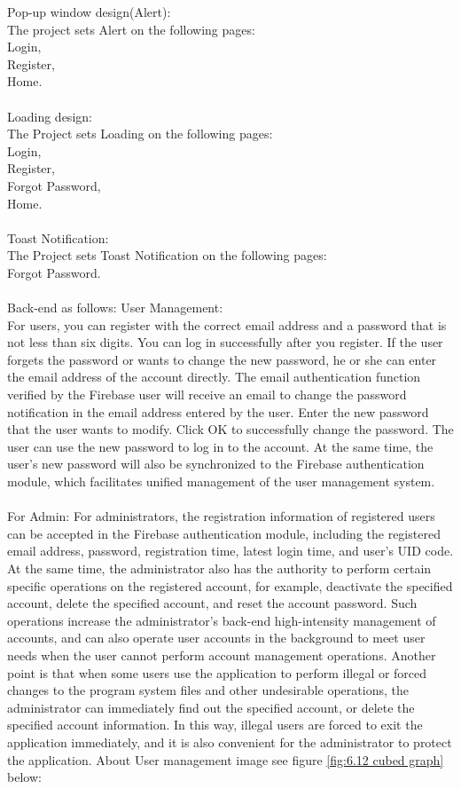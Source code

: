 Pop-up window design(Alert): \\
The project sets Alert on the following pages:\\
Login,\\Register,\\ Home.
\\ \\ 
Loading design: \\
The Project sets Loading on the following pages: \\
Login,\\Register,\\Forgot Password,\\ Home.
\\ \\ 
Toast Notification: \\
The Project sets Toast Notification on the following pages:\\
Forgot Password.
\\ \\
Back-end as follows:
User Management:\\
For users, you can register with the correct email address and a password that is not less than six digits. You can log in successfully after you register. If the user forgets the password or wants to change the new password, he or she can enter the email address of the account directly. The email authentication function verified by the Firebase user will receive an email to change the password notification in the email address entered by the user. Enter the new password that the user wants to modify. Click OK to successfully change the password. The user can use the new password to log in to the account. At the same time, the user's new password will also be synchronized to the Firebase authentication module\cite{3}, which facilitates unified management of the user management system. \\ \\
For Admin:  For administrators, the registration information of registered users can be accepted in the Firebase authentication module\cite{3}, including the registered email address, password, registration time, latest login time, and user's UID code. At the same time, the administrator also has the authority to perform certain specific operations on the registered account, for example, deactivate the specified account, delete the specified account, and reset the account password. Such operations increase the administrator's back-end high-intensity management of accounts, and can also operate user accounts in the background to meet user needs when the user cannot perform account management operations. Another point is that when some users use the application to perform illegal or forced changes to the program system files and other undesirable operations, the administrator can immediately find out the specified account, or delete the specified account information. In this way, illegal users are forced to exit the application immediately, and it is also convenient for the administrator to protect the application. About User management image see figure \ref{fig:6.12 cubed graph} below:
